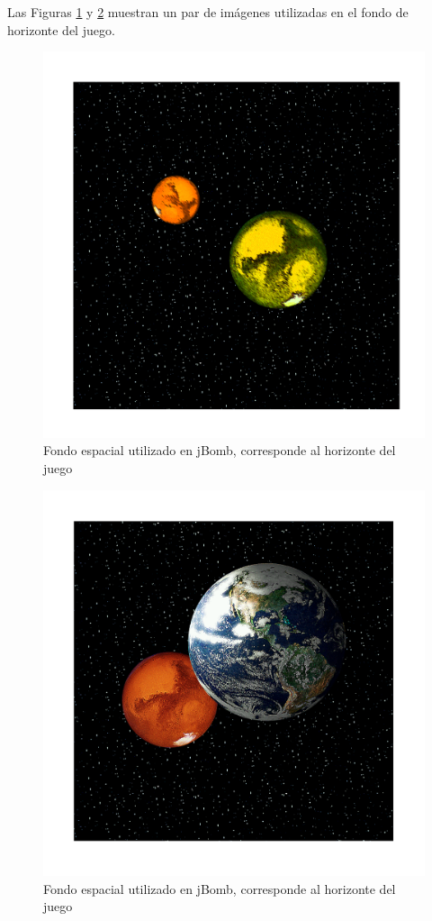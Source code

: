 \documentclass[a4paper,12pt,openany,oneside]{book}
\begin{document}
Las Figuras \ref{sky1label} y \ref{sky2label} muestran un par de imágenes utilizadas en el fondo de horizonte del juego.
\begin{figure}
\begin{center}
\includegraphics[scale=.7]{sky.pdf}
\end{center}
\caption[Fondo espacial utilizado en jBomb (1)]{Fondo espacial utilizado en jBomb, corresponde al horizonte del juego \cite{GB}}
\label{sky1label}
\end{figure}
\begin{figure}
\begin{center}
\includegraphics[scale=.7]{sky2.pdf}
\end{center}
\caption[Fondo espacial utilizado en jBomb (2)]{Fondo espacial utilizado en jBomb, corresponde al horizonte del juego \cite{GB}} 
\label{sky2label}
\end{figure}
\end{document}
